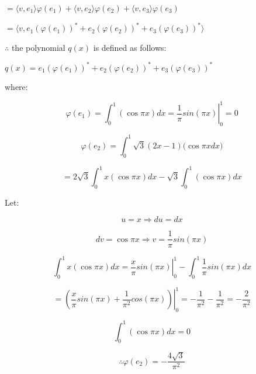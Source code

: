 \documentclass[fleqn]{article}
\begin{document}
\begin{enumerate}[nolistsep]
		$ = \langle v, e_1 \rangle \varphi(e_1) + \langle v, e_2 \rangle \varphi(e_2) + \langle v, e_3 \rangle \varphi(e_3)$
		
		$ = \langle v, e_1(\varphi(e_1))^{*} + e_2(\varphi(e_2))^{*} + e_3(\varphi(e_3))^{*} \rangle$
		
		$\therefore$ the polynomial $q(x)$ is defined as follows:
		
		$q(x) = e_1(\varphi(e_1))^{*} + e_2(\varphi(e_2))^{*} + e_3(\varphi(e_3))^{*}$
		
		where:
		
		\begin{equation*}
			\varphi(e_1) = \int_{0}^{1}{(\cos{{\pi}x})dx} = \left.\frac{1}{\pi}sin({\pi}x)\right\vert_{0}^{1} = 0
		\end{equation*}
		
		\begin{equation*}
			\varphi(e_2) = \int_{0}^{1}{\sqrt{3}(2x - 1)(\cos{{\pi}x}dx})
		\end{equation*}
		
		\begin{equation*}
			 = 2\sqrt{3}\int_{0}^{1}{x(\cos{{\pi}x})dx} - \sqrt{3}\int_{0}^{1}{(\cos{{\pi}x})dx}
		\end{equation*}
		
		Let:
		
		\begin{equation*}
			u = x \Rightarrow du = dx
		\end{equation*}
		
		\begin{equation*}
			dv = \cos{{\pi}x} \Rightarrow v = \frac{1}{\pi}sin({\pi}x)
		\end{equation*}
		
		\begin{equation*}
			\int_{0}^{1}{x(\cos{{\pi}x})dx} = \left.\frac{x}{\pi}sin({\pi}x)\right\vert_{0}^{1} - \int_{0}^{1}{\frac{1}{\pi}sin({\pi}x)dx}
		\end{equation*}
		
		\begin{equation*}
			= \left.\left(\frac{x}{\pi}sin({\pi}x) + \frac{1}{{\pi}^2}cos({\pi}x)\right)\right\vert_{0}^{1} = -\frac{1}{{\pi}^2} - \frac{1}{{\pi}^2} = -\frac{2}{{\pi}^2}
		\end{equation*}
		
		\begin{equation*}
			\int_{0}^{1}{(\cos{{\pi}x})dx} = 0
		\end{equation*}
		
		\begin{equation*}
			\therefore \varphi(e_2) = -\frac{4\sqrt{3}}{{\pi}^2}
		\end{equation*}
		

\end{enumerate}
\end{document}
